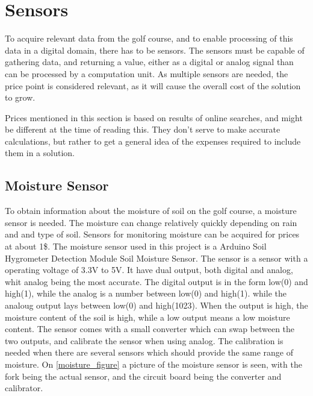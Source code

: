 \section{Sensors}
To acquire relevant data from the golf course, and to enable processing of this data in a digital domain, there has to be sensors.
The sensors must be capable of gathering data, and returning a value, either as a digital or analog signal than can be processed by a computation unit.
As multiple sensors are needed, the price point is considered relevant, as it will cause the overall cost of the solution to grow.

Prices mentioned in this section is based on results of online searches, and might be different at the time of reading this.
They don't serve to make accurate calculations, but rather to get a general idea of the expenses required to include them in a solution.

\subsection{Moisture Sensor}
To obtain information about the moisture of soil on the golf course, a moisture sensor is needed.
The moisture can change relatively quickly depending on rain and and type of soil.
Sensors for monitoring moisture can be acquired for prices at about 1\$.
The moisture sensor used in this project is a Arduino Soil Hygrometer Detection Module Soil Moisture Sensor.
The sensor is a sensor with a operating voltage of 3.3V to 5V.
It have dual output, both digital and analog, whit analog being the most accurate.
The digital output is in the form low(0) and high(1), while the analog is a number between low(0) and high(1)\cite{moisture}.
while the analoug output lays between low(0) and high(1023).
When the output is high, the moisture content of the soil is high, while a low output means a low moisture content.
The sensor comes with a small converter which can swap between the two outputs, and calibrate the sensor when using analog.
The calibration is needed when there are several sensors which should provide the same range of moisture.
On \ref{moisture_figure} a picture of the moisture sensor is seen, with the fork being the actual sensor, and the circuit board being the converter and calibrator. 


